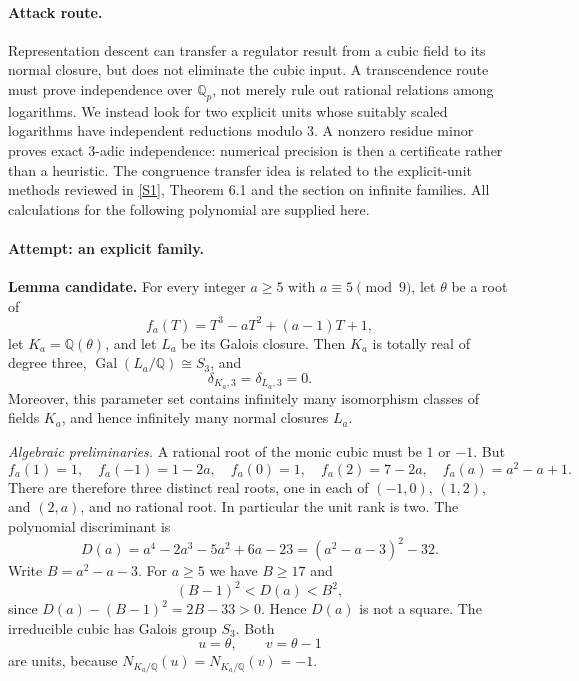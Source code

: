 \documentclass[11pt,a4paper]{article}
\newcommand{\Q}{\mathbb{Q}}
\newcommand{\sref}[2]{\hyperlink{source:#1:#2}{[S#2]}}
\numberwithin{equation}{section}
\begin{document}
\paragraph{Attack route.}
Representation descent can transfer a regulator result from a cubic field
to its normal closure, but does not eliminate the cubic input. A
transcendence route must prove independence over $\Q_p$, not merely rule out
rational relations among logarithms. We instead look for two explicit units
whose suitably scaled logarithms have independent reductions modulo $3$.
A nonzero residue minor proves exact $3$-adic independence: numerical
precision is then a certificate rather than a heuristic. The congruence
transfer idea is related to the explicit-unit methods reviewed in
\sref{1273}{1}, Theorem 6.1 and the section on infinite families. All
calculations for the following polynomial are supplied here.

\paragraph{Attempt: an explicit family.}
\textbf{Lemma candidate.} For every integer $a\ge5$ with $a\equiv5\pmod9$,
let $\theta$ be a root of
\begin{equation}\label{eq156-family}
 f_a(T)=T^3-aT^2+(a-1)T+1,
\end{equation}
let $K_a=\Q(\theta)$, and let $L_a$ be its Galois closure. Then $K_a$ is
totally real of degree three, $\operatorname{Gal}(L_a/\Q)\cong S_3$, and
\[
 \delta_{K_a,3}=\delta_{L_a,3}=0.
\]
Moreover, this parameter set contains infinitely many isomorphism classes
of fields $K_a$, and hence infinitely many normal closures $L_a$.

\textit{Algebraic preliminaries.} A rational root of the monic cubic must be
$1$ or $-1$. But
\[
 f_a(1)=1,\quad f_a(-1)=1-2a,\quad f_a(0)=1,\quad
 f_a(2)=7-2a,\quad f_a(a)=a^2-a+1.
\]
There are therefore three distinct real roots, one in each of
$(-1,0)$, $(1,2)$, and $(2,a)$, and no rational root. In particular the
unit rank is two. The polynomial discriminant is
\begin{equation}\label{eq156-discriminant}
 D(a)=a^4-2a^3-5a^2+6a-23=(a^2-a-3)^2-32.
\end{equation}
Write $B=a^2-a-3$. For $a\ge5$ we have $B\ge17$ and
\[
 (B-1)^2<D(a)<B^2,
\]
since $D(a)-(B-1)^2=2B-33>0$. Hence $D(a)$ is not a square. The
irreducible cubic has Galois group $S_3$. Both
\[
 u=\theta,\qquad v=\theta-1
\]
are units, because $N_{K_a/\Q}(u)=N_{K_a/\Q}(v)=-1$.
\end{document}
